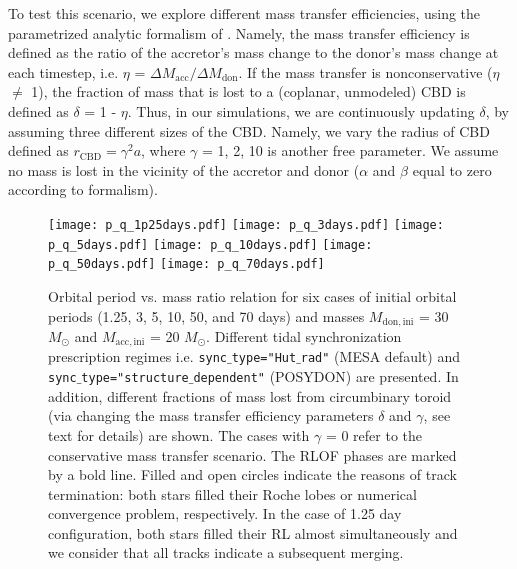 \documentclass{aa}
\begin{document}
To test this scenario, we explore different mass transfer efficiencies,
using the parametrized analytic formalism of \citet{Soberman_1997}.
Namely, the mass transfer efficiency is defined as the ratio
of the accretor's mass change to the donor's mass change at each timestep, i.e. $\eta$ = $\Delta M_\mathrm{acc}/\Delta M_\mathrm{don}$.
If the mass transfer is nonconservative ($\eta$ $\neq$ 1), the fraction of mass
that is lost to a (coplanar, unmodeled) CBD is defined as $\delta$ = 1 - $\eta$.
Thus, in our simulations, we are continuously updating $\delta$, by assuming three different sizes of the CBD.
Namely, we vary the radius of CBD defined as $r_\mathrm{CBD} = \gamma^2 a$, where $\gamma$ = 1, 2, 10 is another free parameter.
We assume no mass is lost in the vicinity of the accretor and donor ($\alpha$ and $\beta$ equal to zero according to \citealt{Soberman_1997} formalism).



\begin{figure*}[!ht]
  \centering
  \texttt{[image: p\_q\_1p25days.pdf]}
  \texttt{[image: p\_q\_3days.pdf]}
  \texttt{[image: p\_q\_5days.pdf]}
  \texttt{[image: p\_q\_10days.pdf]}
  \texttt{[image: p\_q\_50days.pdf]}
  \texttt{[image: p\_q\_70days.pdf]}
  \caption{Orbital period vs. mass ratio relation for six cases
    of initial orbital periods (1.25, 3, 5, 10, 50, and 70 days) and masses $M_\mathrm{don,ini}$ = 30 $M_{\odot}$ and $M_\mathrm{acc,ini}$  = 20
    $M_{\odot}$. Different tidal synchronization prescription regimes i.e. \texttt{sync$\_$type="Hut$\_$rad"} (MESA default)
    and \texttt{sync$\_$type="structure$\_$dependent"} (POSYDON) are presented. In addition, different fractions of mass lost from circumbinary toroid (via changing the mass transfer efficiency parameters \texttt{$\delta$} and \texttt{$\gamma$}, see text for details) are shown. The cases with \texttt{$\gamma$} = 0 refer to the conservative mass transfer scenario. The RLOF
    phases are marked by a bold line. Filled and open circles indicate the reasons of track termination: both stars filled their Roche lobes or numerical convergence problem, respectively. In the case of 1.25 day configuration, both stars filled their RL almost simultaneously and we consider that all tracks indicate a subsequent merging.}
  \label{fig:P_q_post}
\end{figure*}
\end{document}
